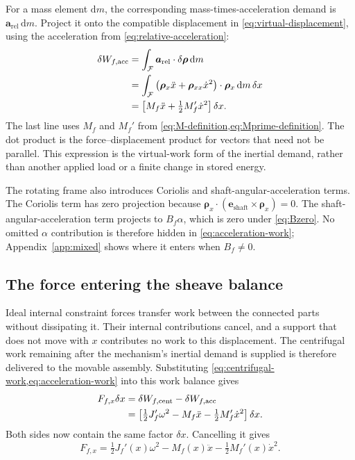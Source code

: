 \documentclass[11pt,letterpaper]{article}
\numberwithin{equation}{section}
\newcommand{\dd}{\mathrm{d}}
\newcommand{\e}{\bm e_{\mathrm{shaft}}}
\newcommand{\rhoo}{\bm\rho}
\newcommand{\half}{\tfrac12}
\begin{document}
For a mass element $\dd m$, the corresponding mass-times-acceleration demand is $\bm a_{\mathrm{rel}}\,\dd m$. Project it onto the compatible displacement in \cref{eq:virtual-displacement}, using the acceleration from \cref{eq:relative-acceleration}:
\begin{align}
  \delta W_{f,\mathrm{acc}}
    &=\int_{\mathcal F}\bm a_{\mathrm{rel}}\cdot\delta\rhoo\,\dd m
        \notag\\
    &=\int_{\mathcal F}
       \left(\rhoo_x\ddot x+\rhoo_{xx}\dot x^2\right)
        \cdot\rhoo_x\,\dd m\,\delta x
        \notag\\
    &=\left[M_f\ddot x+\half M_f'\dot x^2\right]\delta x.
       \label{eq:acceleration-work}
\end{align}
The last line uses $M_f$ and $M_f'$ from \cref{eq:M-definition,eq:Mprime-definition}. The dot product is the force--displacement product for vectors that need not be parallel. This expression is the virtual-work form of the inertial demand, rather than another applied load or a finite change in stored energy.

The rotating frame also introduces Coriolis and shaft-angular-acceleration terms. The Coriolis term has zero projection because
$\rhoo_x\cdot(\e\times\rhoo_x)=0$.
The shaft-angular-acceleration term projects to $B_f\alpha$, which is zero under \cref{eq:Bzero}. No omitted $\alpha$ contribution is therefore hidden in \cref{eq:acceleration-work}; Appendix~\ref{app:mixed} shows where it enters when $B_f\ne0$.

\subsection{The force entering the sheave balance}

Ideal internal constraint forces transfer work between the connected parts without dissipating it. Their internal contributions cancel, and a support that does not move with $x$ contributes no work to this displacement. The centrifugal work remaining after the mechanism's inertial demand is supplied is therefore delivered to the movable assembly. Substituting \cref{eq:centrifugal-work,eq:acceleration-work} into this work balance gives
\begin{align}
  F_{f,x}\delta x
     &=\delta W_{f,\mathrm{cent}}-\delta W_{f,\mathrm{acc}}
       \notag\\
     &=\left[\half J_f'\omega^2-M_f\ddot x
                    -\half M_f'\dot x^2\right]\delta x.
       \label{eq:assembled-work}
\end{align}
Both sides now contain the same factor $\delta x$. Cancelling it gives
\begin{equation}
  \boxed{F_{f,x}
     =\half J_f'(x)\omega^2
      -M_f(x)\ddot x-\half M_f'(x)\dot x^2.}
  \label{eq:force}
\end{equation}
\end{document}
